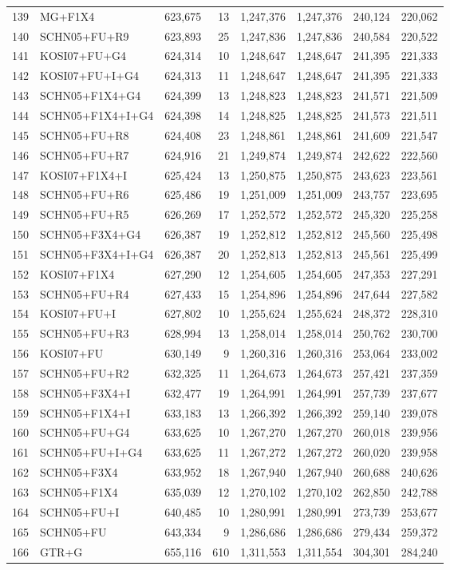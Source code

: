 \begin{longtable}{rlrrrrrr}
139&MG+F1X4&623,675&13&1,247,376&1,247,376&240,124&220,062\\
140&SCHN05+FU+R9&623,893&25&1,247,836&1,247,836&240,584&220,522\\
141&KOSI07+FU+G4&624,314&10&1,248,647&1,248,647&241,395&221,333\\
142&KOSI07+FU+I+G4&624,313&11&1,248,647&1,248,647&241,395&221,333\\
143&SCHN05+F1X4+G4&624,399&13&1,248,823&1,248,823&241,571&221,509\\
144&SCHN05+F1X4+I+G4&624,398&14&1,248,825&1,248,825&241,573&221,511\\
145&SCHN05+FU+R8&624,408&23&1,248,861&1,248,861&241,609&221,547\\
146&SCHN05+FU+R7&624,916&21&1,249,874&1,249,874&242,622&222,560\\
147&KOSI07+F1X4+I&625,424&13&1,250,875&1,250,875&243,623&223,561\\
148&SCHN05+FU+R6&625,486&19&1,251,009&1,251,009&243,757&223,695\\
149&SCHN05+FU+R5&626,269&17&1,252,572&1,252,572&245,320&225,258\\
150&SCHN05+F3X4+G4&626,387&19&1,252,812&1,252,812&245,560&225,498\\
151&SCHN05+F3X4+I+G4&626,387&20&1,252,813&1,252,813&245,561&225,499\\
152&KOSI07+F1X4&627,290&12&1,254,605&1,254,605&247,353&227,291\\
153&SCHN05+FU+R4&627,433&15&1,254,896&1,254,896&247,644&227,582\\
154&KOSI07+FU+I&627,802&10&1,255,624&1,255,624&248,372&228,310\\
155&SCHN05+FU+R3&628,994&13&1,258,014&1,258,014&250,762&230,700\\
156&KOSI07+FU&630,149&9&1,260,316&1,260,316&253,064&233,002\\
157&SCHN05+FU+R2&632,325&11&1,264,673&1,264,673&257,421&237,359\\
158&SCHN05+F3X4+I&632,477&19&1,264,991&1,264,991&257,739&237,677\\
159&SCHN05+F1X4+I&633,183&13&1,266,392&1,266,392&259,140&239,078\\
160&SCHN05+FU+G4&633,625&10&1,267,270&1,267,270&260,018&239,956\\
161&SCHN05+FU+I+G4&633,625&11&1,267,272&1,267,272&260,020&239,958\\
162&SCHN05+F3X4&633,952&18&1,267,940&1,267,940&260,688&240,626\\
163&SCHN05+F1X4&635,039&12&1,270,102&1,270,102&262,850&242,788\\
164&SCHN05+FU+I&640,485&10&1,280,991&1,280,991&273,739&253,677\\
165&SCHN05+FU&643,334&9&1,286,686&1,286,686&279,434&259,372\\
166&GTR+G&655,116&610&1,311,553&1,311,554&304,301&284,240
\end{longtable}

